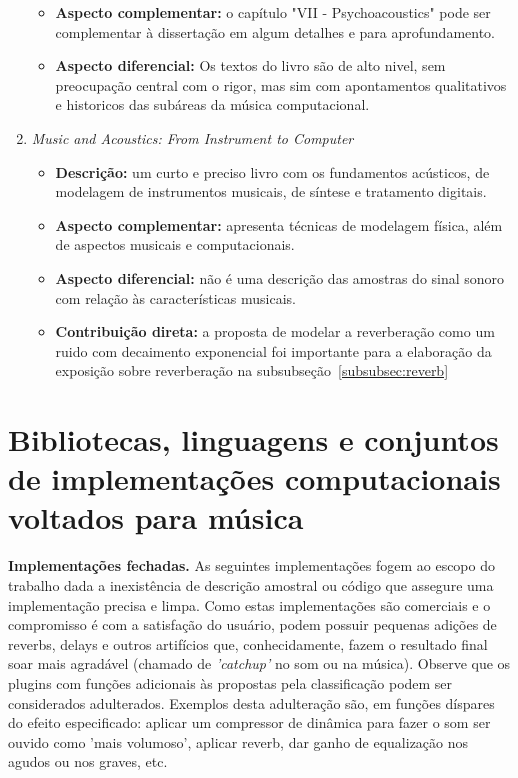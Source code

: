 \begin{enumerate}
\begin{itemize}
            \item {\bf Aspecto complementar:} o capítulo "VII - Psychoacoustics" pode ser complementar à dissertação em algum detalhes e para aprofundamento.
            \item {\bf Aspecto diferencial:} Os textos do livro são de alto nivel, sem preocupação central com o rigor, mas sim com apontamentos qualitativos e historicos das subáreas da música computacional. 
        \end{itemize}
    \item \emph{Music and Acoustics: From Instrument to Computer}
        \begin{itemize}
            \item {\bf Descrição:} um curto e preciso livro com os fundamentos acústicos, de modelagem de instrumentos musicais, de síntese e tratamento digitais.
            \item {\bf Aspecto complementar:} apresenta técnicas de modelagem física, além de aspectos musicais e computacionais.
            \item {\bf Aspecto diferencial:} não é uma descrição das amostras do sinal sonoro com relação às características musicais.
            \item {\bf Contribuição direta:} a proposta de modelar a reverberação como um ruido com decaimento exponencial foi importante para a elaboração da exposição sobre reverberação na subsubseção~\ref{subsubsec:reverb}
        \end{itemize}
\end{enumerate}

\section{Bibliotecas, linguagens e conjuntos de implementações computacionais voltados para música}\label{subsec:bibs}
{\bf Implementações fechadas.} As seguintes implementações fogem ao escopo do trabalho dada a inexistência de descrição amostral ou código que assegure uma implementação precisa e limpa. Como estas implementações são comerciais e o compromisso é com a satisfação do usuário, podem possuir pequenas adições de reverbs, delays e outros artifícios que, conhecidamente, fazem o resultado final soar mais agradável (chamado de \emph{'catchup'} no som ou na música). Observe que os plugins com funções adicionais às propostas pela classificação podem ser considerados adulterados. Exemplos desta adulteração são, em funções díspares do efeito especificado: aplicar um compressor de dinâmica para fazer o som ser ouvido como 'mais volumoso', aplicar reverb, dar ganho de equalização nos agudos ou nos graves, etc. 

